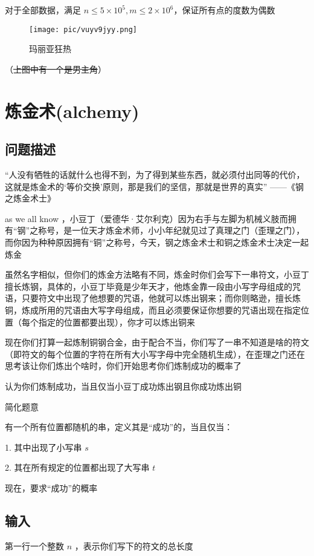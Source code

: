 \documentclass[UTF8]{ctexart}
\begin{document}
对于全部数据，满足 $n\leq 5\times 10 ^ 5, m\leq 2\times 10 ^ 6$，保证所有点的度数为偶数

\begin{figure}[h]
    \centering
    \texttt{[image: pic/vuyv9jyy.png]}
    \caption{玛丽亚狂热}
    \label{fig:enter-label}
\end{figure}

（\sout{上图中有一个是男主角}）

\newpage
\section{炼金术(alchemy)}
\begin{center}
\end{center}
\subsection{问题描述}
“人没有牺牲的话就什么也得不到，为了得到某些东西，就必须付出同等的代价，这就是炼金术的‘等价交换’原则，那是我们的坚信，那就是世界的真实”	——《钢之炼金术士》

as we all know ，小豆丁（爱德华·艾尔利克）因为右手与左脚为机械义肢而拥有“钢”之称号，是一位天才炼金术师，小小年纪就见过了真理之门（歪理之门），而你因为种种原因拥有“铜”之称号，今天，钢之炼金术士和铜之炼金术士决定一起炼金

虽然名字相似，但你们的炼金方法略有不同，炼金时你们会写下一串符文，小豆丁擅长炼钢，具体的，小豆丁毕竟是少年天才，他炼金靠一段由小写字母组成的咒语，只要符文中出现了他想要的咒语，他就可以炼出钢来；而你则略逊，擅长炼铜，炼成所用的咒语由大写字母组成，而且必须要保证你想要的咒语出现在指定位置（每个指定的位置都要出现），你才可以炼出铜来

现在你们打算一起炼制铜钢合金，由于配合不当，你们写了一串不知道是啥的符文（即符文的每个位置的字符在所有大小写字母中完全随机生成），在歪理之门还在思考该让你们炼出个啥时，你们开始思考你们炼制成功的概率了

认为你们炼制成功，当且仅当小豆丁成功炼出钢且你成功炼出铜

\vspace{5mm}
简化题意

有一个所有位置都随机的串，定义其是“成功”的，当且仅当：

1. 其中出现了小写串 $s$ 

2. 其在所有规定的位置都出现了大写串 $t$ 

现在，要求“成功”的概率

\subsection{输入}
第一行一个整数 $n$ ，表示你们写下的符文的总长度
\end{document}
